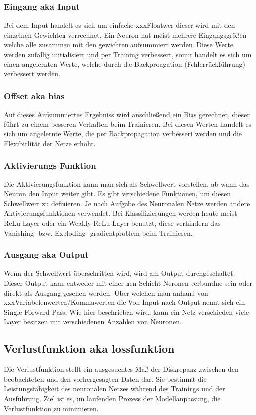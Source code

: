 \subsubsection{Eingang aka Input}
Bei dem Input handelt es sich um einfache xxxFloatwer dieser wird mit den einzelnen Gewichten verrechnet. Ein Neuron hat meist mehrere Eingangsgrößen welche alle zusammen mit den gewichten aufsummiert werden. Diese Werte werden zufällig initialisiert und per Training verbessert, somit handelt es sich um einen angelernten Werte, welche durch die Backproagation (Fehlerrückführung) verbessert werden.

\subsubsection{Offset aka bias}
Auf dieses Aufsummiertes Ergebniss wird anschließend ein Bias gerechnet, dieser führt zu einem besseren Verhalten beim Trainieren. Bei diesen Werten handelt es sich um angelernte Werte, die per Backpropagation verbessert werden und die Flexibitlität der Netze erhöht.


\subsubsection{Aktivierungs Funktion}
Die Aktivierungsfunktion kann man sich als Schwellwert vorstellen, ab wann das Neuron den Input weiter gibt. Es gibt verschiedene Funktionen, um diesen Schwellwert zu definieren. Je nach Aufgabe des Neuronalen Netze werden andere Aktivierungsfunktionen verwendet. Bei Klassifizierungen werden heute meist ReLu-Layer oder ein Weakly-ReLu Layer benutzt, diese verhindern das Vanishing- bzw. Exploding- gradientproblem beim Trainieren.

\subsubsection{Ausgang aka Output}
Wenn der Schwellwert überschritten wird, wird am Output durchgeschaltet. Dieser Output kann entweder mit einer nen Schicht Neronen verbundne sein oder direkt als Ausgang gesehen werden. Über welchen man anhand von xxxVariabelenwerten/Kommawerten die 
Von Input nach Output nennt sich ein Single-Forward-Pass. Wie hier beschrieben wird, kann ein Netz verschieden viele Layer besitzen mit verschiedenen Anzahlen von Neuronen.

\subsection{Verlustfunktion aka lossfunktion}
Die Verlustfunktion stellt ein ausgesuchtes Maß der Diskrepanz zwischen den beobachteten und den vorhergesagten Daten dar. Sie bestimmt die Leistungsfähigkeit des neuronalen Netzes während des Trainings und der Ausführung. Ziel ist es, im laufenden Prozess der Modellanpassung, die Verlustfunktion zu minimieren.

